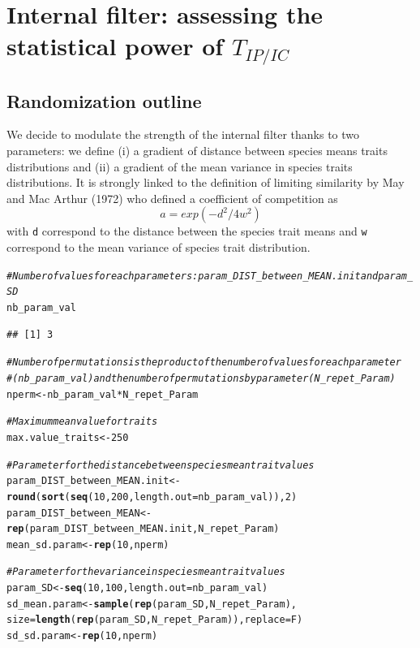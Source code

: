 \documentclass[12pt]{article}\usepackage[]{graphicx}\usepackage[]{color}
\makeatletter
\newcommand{\hlnum}[1]{\textcolor[rgb]{0.686,0.059,0.569}{#1}}%
\newcommand{\hlcom}[1]{\textcolor[rgb]{0.678,0.584,0.686}{\textit{#1}}}%
\newcommand{\hlopt}[1]{\textcolor[rgb]{0,0,0}{#1}}%
\newcommand{\hlstd}[1]{\textcolor[rgb]{0.345,0.345,0.345}{#1}}%
\newcommand{\hlkwb}[1]{\textcolor[rgb]{0.69,0.353,0.396}{#1}}%
\newcommand{\hlkwc}[1]{\textcolor[rgb]{0.333,0.667,0.333}{#1}}%
\newcommand{\hlkwd}[1]{\textcolor[rgb]{0.737,0.353,0.396}{\textbf{#1}}}%
\newenvironment{kframe}{%
 \def\at@end@of@kframe{}%
 \ifinner\ifhmode%
  \def\at@end@of@kframe{\end{minipage}}%
  \begin{minipage}{\columnwidth}%
 \fi\fi%
 \def\FrameCommand##1{\hskip\@totalleftmargin \hskip-\fboxsep
 \colorbox{shadecolor}{##1}\hskip-\fboxsep
     \hskip-\linewidth \hskip-\@totalleftmargin \hskip\columnwidth}%
 \MakeFramed {\advance\hsize-\width
   \@totalleftmargin\z@ \linewidth\hsize
   \@setminipage}}%
 {\par\unskip\endMakeFramed%
 \at@end@of@kframe}
\newenvironment{knitrout}{}{} %
\makeatother
\begin{document}
\cleardoublepage

\section{Internal filter: assessing the statistical power of $T_{IP/IC}$}
  \subsection {Randomization outline}
 
We decide to modulate the strength of the internal filter thanks to two parameters:
we define (i) a gradient of distance between species means traits distributions and (ii) a gradient of the mean variance in species traits distributions. It is strongly linked to the definition of limiting similarity by May and Mac Arthur (1972) who defined a coefficient of competition as $$a = exp (-d^2/4w^2)$$ with \texttt{d} correspond to the distance between the species trait means and \texttt{w} correspond to the mean variance of species trait distribution. 

\begin{knitrout}\small
{}\color{fgcolor}\begin{kframe}
\begin{alltt}
\hlcom{# Number of values for each parameters: param_DIST_between_MEAN.init and param_SD}
\hlstd{nb_param_val}
\end{alltt}
\begin{verbatim}
## [1] 3
\end{verbatim}
\begin{alltt}
\hlcom{# Number of permutations is the product of the number of values for each parameter}
\hlcom{#(nb_param_val) and the number of permutations by parameter (N_repet_Param)}
\hlstd{nperm} \hlkwb{<-} \hlstd{nb_param_val} \hlopt{*} \hlstd{N_repet_Param}

\hlcom{# Maximum mean value for traits}
\hlstd{max.value_traits} \hlkwb{<-} \hlnum{250}

\hlcom{# Parameter for the distance between species mean trait values}
\hlstd{param_DIST_between_MEAN.init} \hlkwb{<-} \hlkwd{round}\hlstd{(}\hlkwd{sort}\hlstd{(}\hlkwd{seq}\hlstd{(}\hlnum{10}\hlstd{,} \hlnum{200}\hlstd{,} \hlkwc{length.out} \hlstd{= nb_param_val)),} \hlnum{2}\hlstd{)}
\hlstd{param_DIST_between_MEAN} \hlkwb{<-} \hlkwd{rep}\hlstd{(param_DIST_between_MEAN.init, N_repet_Param)}
\hlstd{mean_sd.param} \hlkwb{<-} \hlkwd{rep}\hlstd{(}\hlnum{10}\hlstd{, nperm)}

\hlcom{# Parameter for the variance in species mean trait values}
\hlstd{param_SD} \hlkwb{<-} \hlkwd{seq}\hlstd{(}\hlnum{10}\hlstd{,} \hlnum{100}\hlstd{,}\hlkwc{length.out} \hlstd{= nb_param_val)}
\hlstd{sd_mean.param} \hlkwb{<-} \hlkwd{sample} \hlstd{(}\hlkwd{rep}\hlstd{(param_SD, N_repet_Param),}
       \hlkwc{size} \hlstd{=} \hlkwd{length}\hlstd{(}\hlkwd{rep}\hlstd{(param_SD, N_repet_Param)),} \hlkwc{replace} \hlstd{= F)}
\hlstd{sd_sd.param} \hlkwb{<-} \hlkwd{rep}\hlstd{(}\hlnum{10}\hlstd{, nperm)}
\end{alltt}
\end{kframe}
\end{knitrout}
\end{document}
